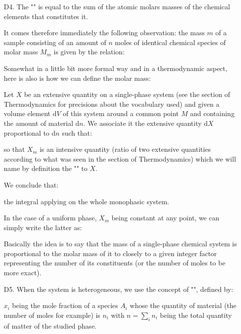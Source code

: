 \begin{enumerate}
		\item[D4.] The "" is equal to the sum of the atomic molars  masses of the chemical elements that constitutes it.
		
		It comes therefore immediately the following observation: the mass $m$ of a sample consisting of an amount of $n$ moles of identical chemical species of molar mass $M_m$ is given by the relation:
		
		Somewhat in a little bit more formal way and in a thermodynamic aspect, here is also is how we can define the molar mass:
		
		Let $X$ be an extensive quantity on a single-phase system (see the section of Thermodynamics for precisions about the vocabulary used) and given a volume element $\mathrm{d}V$ of this system around a common point $M$ and containing the amount of material $\mathrm{d}n$. We associate it the extensive quantity $\mathrm{d}X$ proportional to $\mathrm{d}n$ such that:
		
		so that $X_m$ is an intensive quantity (ratio of two extensive quantities according to what was seen in the section of Thermodynamics) which we will name by definition the "" to $X$.
		
		We conclude that:
		
		the integral applying on the whole monophasic system.
		
		In the case of a uniform phase, $X_m$ being constant at any point, we can simply write the latter as:
		
		\begin{tcolorbox}[title=Remark,arc=10pt,breakable,drop lifted shadow,
  skin=enhanced,
  skin first is subskin of={enhancedfirst}{arc=10pt,no shadow},
  skin middle is subskin of={enhancedmiddle}{arc=10pt,no shadow},
  skin last is subskin of={enhancedlast}{drop lifted shadow}]
		Basically the idea is to say that the mass of a single-phase chemical system is proportional to the molar mass of it to closely to a given integer factor representing the number of its constituents (or the number of moles to be more exact).
		\end{tcolorbox}	
		
		\item[D5.] When the system is heterogeneous, we use the concept of "", defined by:
		
		$x_i$ being the mole fraction of a species $A_i$ whose the quantity of material (the number of moles for example) is $n_i$ with $n=\sum_i n_i$ being the total quantity of matter of the studied phase.
		

\end{enumerate}
